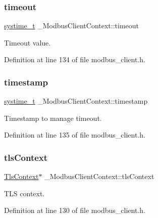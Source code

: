 \subsubsection{\texorpdfstring{timeout}{timeout}}
{\footnotesize\ttfamily \hyperlink{compiler__port_8h_ae3e32a98d431a02106616da3071832dd}{systime\+\_\+t} \+\_\+\+Modbus\+Client\+Context\+::timeout}



Timeout value. 



Definition at line 134 of file modbus\+\_\+client.\+h.

\mbox{\label{struct__ModbusClientContext_adb844f82f7243f6479afba2e8491f558}} 
\subsubsection{\texorpdfstring{timestamp}{timestamp}}
{\footnotesize\ttfamily \hyperlink{compiler__port_8h_ae3e32a98d431a02106616da3071832dd}{systime\+\_\+t} \+\_\+\+Modbus\+Client\+Context\+::timestamp}



Timestamp to manage timeout. 



Definition at line 135 of file modbus\+\_\+client.\+h.

\mbox{\label{struct__ModbusClientContext_ab438d0f8a9c7282c19e15d4219a6bae8}} 
\subsubsection{\texorpdfstring{tls\+Context}{tlsContext}}
{\footnotesize\ttfamily \hyperlink{tls_8h_ac09f7a286c0cdf9b07ee1edd107946f5}{Tls\+Context}$\ast$ \+\_\+\+Modbus\+Client\+Context\+::tls\+Context}



T\+LS context. 



Definition at line 130 of file modbus\+\_\+client.\+h.

